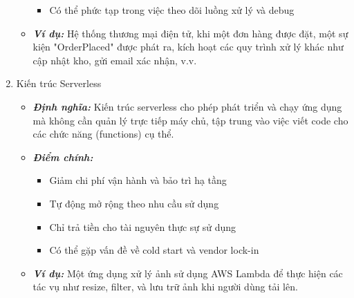 \begin{enumerate}
\begin{itemize}
\begin{itemize}
            \item Có thể phức tạp trong việc theo dõi luồng xử lý và debug
        \end{itemize}
        \item \textbf{\textit{Ví dụ:}} Hệ thống thương mại điện tử, khi một đơn hàng được đặt, một sự kiện "OrderPlaced" được phát ra, kích hoạt các quy trình xử lý khác như cập nhật kho, gửi email xác nhận, v.v.
    \end{itemize}
    \item Kiến trúc Serverless
    \begin{itemize}
        \item \textbf{\textit{Định nghĩa:}} Kiến trúc serverless cho phép phát triển và chạy ứng dụng mà không cần quản lý trực tiếp máy chủ, tập trung vào việc viết code cho các chức năng (functions) cụ thể.
        \item \textbf{\textit{Điểm chính:}} 
        \begin{itemize}
            \item Giảm chi phí vận hành và bảo trì hạ tầng
            \item Tự động mở rộng theo nhu cầu sử dụng
            \item Chỉ trả tiền cho tài nguyên thực sự sử dụng
            \item Có thể gặp vấn đề về cold start và vendor lock-in
        \end{itemize}
        \item \textbf{\textit{Ví dụ:}} Một ứng dụng xử lý ảnh sử dụng AWS Lambda để thực hiện các tác vụ như resize, filter, và lưu trữ ảnh khi người dùng tải lên.
    \end{itemize}
\end{enumerate}


